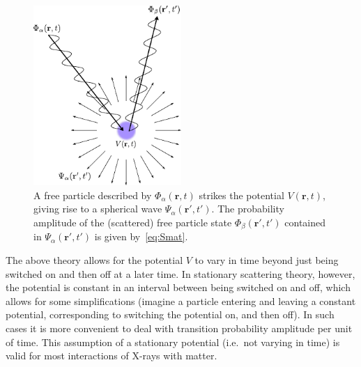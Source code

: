\documentclass[10pt,twoside, b5paper,pdftex]{report}
\begin{document}
\begin{figure}[htbp]
	\begin{center}
		\includegraphics[width=0.5\textwidth]{figures/scattering.pdf}		
	\end{center}
	\caption{A free particle described by  $\Phi_{\alpha}(\mathbf{r},t)$ strikes the potential $V(\mathbf{r},t)$, giving rise to a spherical wave $\Psi_{\alpha}(\mathbf{r}',t')$. The  probability amplitude of the (scattered) free particle state $\Phi_{\beta}(\mathbf{r}',t')$ contained in $\Psi_{\alpha}(\mathbf{r}',t')$ is given by~\cref{eq:Smat}. \label{fig:scattering}}
\end{figure}

The above theory allows for the potential $V$ to vary in time beyond just being switched on and then off at a later time. In stationary scattering theory, however, the potential is constant in an interval between being switched on and off, which allows for some simplifications (imagine a particle entering and leaving a constant potential, corresponding to switching the potential on, and then off). In such cases it is more convenient to deal with transition probability amplitude per unit of time. This assumption of a stationary potential (i.e.~not varying in time) is valid for most interactions of X-rays with matter. 
\end{document}

